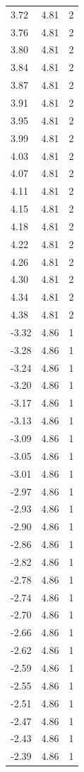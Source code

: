 \begin{longtable}{lrr}
  3.72 & 4.81 & 2 \\
  3.76 & 4.81 & 2 \\
  3.80 & 4.81 & 2 \\
  3.84 & 4.81 & 2 \\
  3.87 & 4.81 & 2 \\
  3.91 & 4.81 & 2 \\
  3.95 & 4.81 & 2 \\
  3.99 & 4.81 & 2 \\
  4.03 & 4.81 & 2 \\
  4.07 & 4.81 & 2 \\
  4.11 & 4.81 & 2 \\
  4.15 & 4.81 & 2 \\
  4.18 & 4.81 & 2 \\
  4.22 & 4.81 & 2 \\
  4.26 & 4.81 & 2 \\
  4.30 & 4.81 & 2 \\
  4.34 & 4.81 & 2 \\
  4.38 & 4.81 & 2 \\
  -3.32 & 4.86 & 1 \\
  -3.28 & 4.86 & 1 \\
  -3.24 & 4.86 & 1 \\
  -3.20 & 4.86 & 1 \\
  -3.17 & 4.86 & 1 \\
  -3.13 & 4.86 & 1 \\
  -3.09 & 4.86 & 1 \\
  -3.05 & 4.86 & 1 \\
  -3.01 & 4.86 & 1 \\
  -2.97 & 4.86 & 1 \\
  -2.93 & 4.86 & 1 \\
  -2.90 & 4.86 & 1 \\
  -2.86 & 4.86 & 1 \\
  -2.82 & 4.86 & 1 \\
  -2.78 & 4.86 & 1 \\
  -2.74 & 4.86 & 1 \\
  -2.70 & 4.86 & 1 \\
  -2.66 & 4.86 & 1 \\
  -2.62 & 4.86 & 1 \\
  -2.59 & 4.86 & 1 \\
  -2.55 & 4.86 & 1 \\
  -2.51 & 4.86 & 1 \\
  -2.47 & 4.86 & 1 \\
  -2.43 & 4.86 & 1 \\
  -2.39 & 4.86 & 1 \\

\end{longtable}
